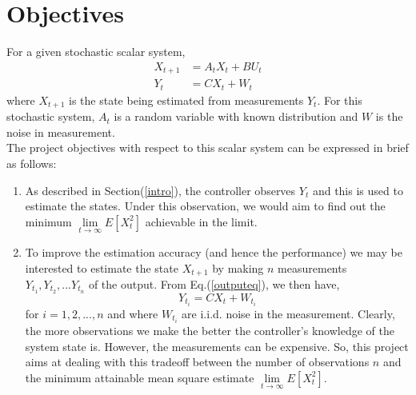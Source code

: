 \documentclass[a4paper,12pt]{article}
\begin{document}
\section{Objectives}
For a given stochastic scalar system,
\begin{align}
X_{t+1} &= A_{t}X_{t} + BU_{t} \\ 
\label{outputeq}
Y_{t} &= CX_{t} + W_{t}
\end{align}
where $X_{t+1}$ is the state being estimated from measurements $Y_{t}$. For this stochastic system, $A_{t}$ is a random variable with known distribution and $W$ is the noise in measurement.\\

The project objectives with respect to this scalar system can be expressed in brief as follows:
\begin{enumerate}
\item As described in Section(\ref{intro}), the controller observes $Y_{t}$ and this is used to estimate the states. Under this observation, we would aim to find out the minimum $\underset{t \to \infty}\lim E[{X_{t}^2}]$ achievable in the limit.
\item To improve the estimation accuracy (and hence the performance) we may be interested to estimate the state $X_{t+1}$ by making $n$ measurements $Y_{t_{1}}, Y_{t_{2}}, ... Y_{t_{n}}$ of the output. From Eq.(\ref{outputeq}), we then have,
\begin{equation}
Y_{t_{i}} = CX_{t} + W_{t_{i}} 
\end{equation}
for $i=1,2,..., n$ and where $W_{t_{i}}$ are i.i.d. noise in the measurement.
Clearly, the more observations we make the better the controller’s knowledge of the system state is. However, the measurements can be expensive. So, this project aims at dealing with this tradeoff between the number of observations $n$ and the minimum attainable mean square estimate $\underset{t \to \infty}\lim E[{X_{t}^{2}}]$.
\end{enumerate}
\end{document}
